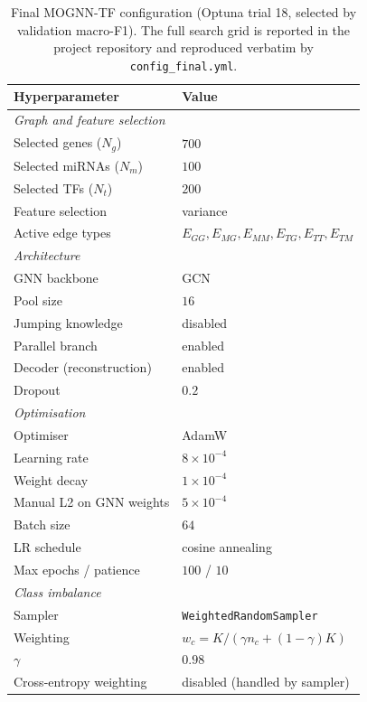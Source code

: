 \documentclass[11pt]{article}
\begin{document}
\begin{table}[t]
\centering
\caption{Final MOGNN-TF configuration (Optuna trial 18, selected by
validation macro-F1). The full search grid is reported in the project
repository and reproduced verbatim by \texttt{config\_final.yml}.}
\label{tab:hyperparams}
\small
\begin{tabular}{ll}
\toprule
\textbf{Hyperparameter} & \textbf{Value} \\
\midrule
\multicolumn{2}{l}{\textit{Graph and feature selection}} \\
\quad Selected genes ($N_g$)        & $700$ \\
\quad Selected miRNAs ($N_m$)       & $100$ \\
\quad Selected TFs ($N_t$)          & $200$ \\
\quad Feature selection             & variance \\
\quad Active edge types             & $E_{GG}, E_{MG}, E_{MM}, E_{TG}, E_{TT}, E_{TM}$ \\
\midrule
\multicolumn{2}{l}{\textit{Architecture}} \\
\quad GNN backbone                  & GCN \\
\quad Pool size                     & $16$ \\
\quad Jumping knowledge             & disabled \\
\quad Parallel branch               & enabled \\
\quad Decoder (reconstruction)      & enabled \\
\quad Dropout                       & $0.2$ \\
\midrule
\multicolumn{2}{l}{\textit{Optimisation}} \\
\quad Optimiser                     & AdamW \\
\quad Learning rate                 & $8 \times 10^{-4}$ \\
\quad Weight decay                  & $1 \times 10^{-4}$ \\
\quad Manual L2 on GNN weights      & $5 \times 10^{-4}$ \\
\quad Batch size                    & $64$ \\
\quad LR schedule                   & cosine annealing \\
\quad Max epochs / patience         & $100$ / $10$ \\
\midrule
\multicolumn{2}{l}{\textit{Class imbalance}} \\
\quad Sampler                       & \texttt{WeightedRandomSampler} \\
\quad Weighting                     & $w_c = K/(\gamma n_c + (1-\gamma)K)$ \\
\quad $\gamma$                      & $0.98$ \\
\quad Cross-entropy weighting       & disabled (handled by sampler) \\
\bottomrule
\end{tabular}
\end{table}
\end{document}
